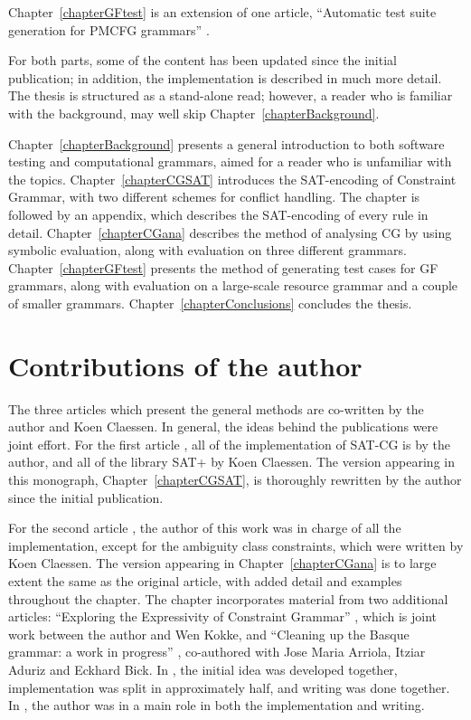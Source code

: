 Chapter~\ref{chapterGFtest} is an extension of one article, ``Automatic test suite generation for PMCFG grammars'' \cite{listenmaa_claessen2018}.

For both parts, some of the content has been updated since the initial publication; in addition, the implementation is described in much more detail. The thesis is structured as a stand-alone read; however, a reader who is familiar with the background, may well skip Chapter~\ref{chapterBackground}.

Chapter~\ref{chapterBackground} presents a general introduction to both software testing and computational grammars, aimed for a reader who is unfamiliar with the topics.
Chapter~\ref{chapterCGSAT} introduces the SAT-encoding of Constraint Grammar, with two different schemes for conflict handling. The chapter is followed by an appendix, which describes the SAT-encoding of every rule in detail.
Chapter~\ref{chapterCGana}
describes the method of analysing CG by using symbolic evaluation, along with evaluation on three different grammars.
Chapter~\ref{chapterGFtest} presents the method of generating test cases for GF grammars, along with evaluation on a large-scale resource grammar and a couple of smaller grammars.
Chapter~\ref{chapterConclusions} concludes the thesis.


\section{Contributions of the author}

The three articles which present the general methods \cite{listenmaa_claessen2015,listenmaa_claessen2016,listenmaa_claessen2018} are co-written by the author and Koen Claessen.
In general, the ideas behind the publications were joint effort.
For the first article \cite{listenmaa_claessen2015}, all of the implementation of SAT-CG is by the author,
and all of the library SAT+ by Koen Claessen.
The version appearing in this monograph, Chapter~\ref{chapterCGSAT}, is thoroughly rewritten by the author since the initial publication.

For the second article \cite{listenmaa_claessen2016}, the author of this work was in charge of all the implementation, except for the ambiguity class constraints, which were written by Koen Claessen.
The version appearing in Chapter~\ref{chapterCGana} is to large extent the same as the original article, with added detail and examples throughout the chapter. The chapter incorporates material from two additional articles: ``Exploring the Expressivity of Constraint Grammar'' \cite{kokke2017expressivity}, which is joint work between the author and Wen Kokke, and ``Cleaning up the Basque grammar: a work in progress'' \cite{listenmaa2017basque}, co-authored with Jose Maria Arriola, Itziar Aduriz and Eckhard Bick. In \cite{kokke2017expressivity}, the initial idea was developed together, implementation was split in approximately half, and writing was done together. In \cite{listenmaa2017basque}, the author was in a main role in both the implementation and writing.

